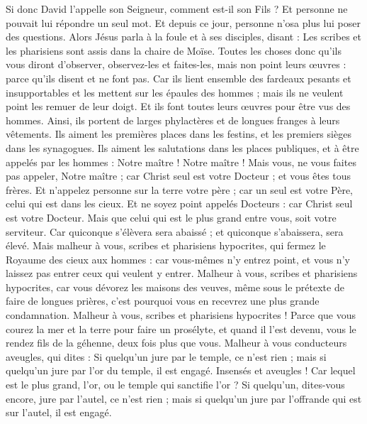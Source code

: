 \begin{multicols}{2}
Si donc David l'appelle son Seigneur, comment est-il son Fils ?
Et personne ne pouvait lui répondre un seul mot. Et depuis ce jour, personne n'osa plus lui poser des questions.
\VerseOne{}Alors Jésus parla à la foule et à ses disciples,
disant : Les scribes et les pharisiens sont assis dans la chaire de Moïse.
Toutes les choses donc qu'ils vous diront d'observer, observez-les et faites-les, mais non point leurs œuvres : parce qu'ils disent et ne font pas.
Car ils lient ensemble des fardeaux pesants et insupportables et les mettent sur les épaules des hommes ; mais ils ne veulent point les remuer de leur doigt.
Et ils font toutes leurs œuvres pour être vus des hommes. Ainsi, ils portent de larges phylactères et de longues franges à leurs vêtements.
Ils aiment les premières places dans les festins, et les premiers sièges dans les synagogues.
Ils aiment les salutations dans les places publiques, et à être appelés par les hommes : Notre maître ! Notre maître !
Mais vous, ne vous faites pas appeler, Notre maître ; car Christ seul est votre Docteur ; et vous êtes tous frères.
Et n'appelez personne sur la terre votre père ; car un seul est votre Père, celui qui est dans les cieux.
Et ne soyez point appelés Docteurs : car Christ seul est votre Docteur.
Mais que celui qui est le plus grand entre vous, soit votre serviteur.
Car quiconque s'élèvera sera abaissé ; et quiconque s'abaissera, sera élevé.
Mais malheur à vous, scribes et pharisiens hypocrites, qui fermez le Royaume des cieux aux hommes : car vous-mêmes n'y entrez point, et vous n'y laissez pas entrer ceux qui veulent y entrer.
Malheur à vous, scribes et pharisiens hypocrites, car vous dévorez les maisons des veuves, même sous le prétexte de faire de longues prières, c'est pourquoi vous en recevrez une plus grande condamnation.
Malheur à vous, scribes et pharisiens hypocrites ! Parce que vous courez la mer et la terre pour faire un prosélyte, et quand il l'est devenu, vous le rendez fils de la géhenne, deux fois plus que vous.
Malheur à vous conducteurs aveugles, qui dites : Si quelqu'un jure par le temple, ce n'est rien ; mais si quelqu'un jure par l'or du temple, il est engagé.
Insensés et aveugles ! Car lequel est le plus grand, l'or, ou le temple qui sanctifie l'or ?
Si quelqu'un, dites-vous encore, jure par l'autel, ce n'est rien ; mais si quelqu'un jure par l'offrande qui est sur l'autel, il est engagé.

\end{multicols}
